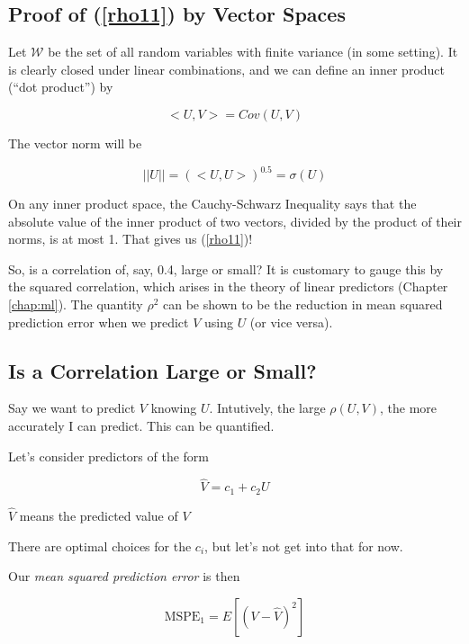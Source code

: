 \subsection{Proof of (\ref{rho11}) by Vector Spaces}

Let $\mathcal{W}$ be the set of all random variables with finite
variance (in some setting).  It is clearly closed under linear
combinations, and we can define an inner product (``dot product'') by

\begin{equation}
<U,V> = Cov(U,V)
\end{equation}

The vector norm will be

\begin{equation}
||U|| = (<U,U>)^{0.5} = \sigma(U)
\end{equation}

On any inner product space, the Cauchy-Schwarz Inequality says that the
absolute value of the inner product of two vectors, divided by the
product of their norms, is at most 1.  That gives us (\ref{rho11})!

So, is a correlation of, say, 0.4, large or small?  It is customary to
gauge this by the squared correlation, which arises in the theory of
linear predictors (Chapter \ref{chap:ml}).  The quantity $\rho^2$ can be
shown to be the reduction in mean squared prediction error when we
predict $V$ using $U$ (or vice versa).

\subsection{Is a Correlation Large or Small?}

Say we want to predict $V$ knowing $U$.  Intutively, the large
$\rho(U,V)$, the more accurately I can predict.  This can be quantified.

Let's consider predictors of the form

\begin{equation}
\label{predv}
\widehat{V} = c_1 + c_2 U
\end{equation}

$\widehat{V}$ means the predicted value of $V$

There are optimal choices for the $c_i$, but let's not get into that for
now.

Our \textit{mean squared prediction error} is then

\begin{equation}
\textrm{MSPE}_1 = E[(V - \widehat{V})^2]
\end{equation}

